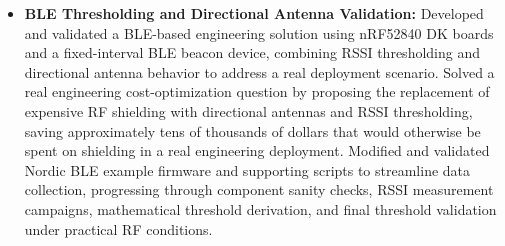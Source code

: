 \documentclass[letterpaper,11pt]{article}
\begin{document}
\begin{itemize}[leftmargin=1.5em]
  \item \textbf{BLE Thresholding and Directional Antenna Validation:} Developed and validated a BLE-based engineering solution using nRF52840 DK boards and a fixed-interval BLE beacon device, combining RSSI thresholding and directional antenna behavior to address a real deployment scenario. Solved a real engineering cost-optimization question by proposing the replacement of expensive RF shielding with directional antennas and RSSI thresholding, saving approximately tens of thousands of dollars that would otherwise be spent on shielding in a real engineering deployment. Modified and validated Nordic BLE example firmware and supporting scripts to streamline data collection, progressing through component sanity checks, RSSI measurement campaigns, mathematical threshold derivation, and final threshold validation under practical RF conditions.
  
\end{itemize}
\end{document}
